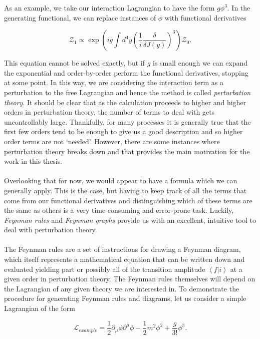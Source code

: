 As an example, we take our interaction Lagrangian to have the form $g \phi^3$. In the generating functional, we can replace instances of $\phi$ with functional derivatives

\begin{equation}
\mathcal{Z}_1 \propto \exp \left( i g \int d^4 y \left(\frac{1}{i} \frac{\delta}{\delta J(y)} \right)^3 \right) \mathcal{Z}_0.
\end{equation}

This equation cannot be solved exactly, but if $g$ is small enough we can expand the exponential and order-by-order perform the functional derivatives, stopping at some point. In this way, we are considering the interaction term as a perturbation to the free Lagrangian and hence the method is called \emph{perturbation theory}. It should be clear that as the calculation proceeds to higher and higher orders in perturbation theory, the number of terms to deal with gets uncontrollably large. Thankfully, for many processes it is generally true that the first few orders tend to be enough to give us a good description and so higher order terms are not `needed'. However, there are some instances where perturbation theory breaks down and that provides the main motivation for the work in this thesis. \\
\\
Overlooking that for now, we would appear to have a formula which we can generally apply. This is the case, but having to keep track of all the terms that come from our functional derivatives and distinguishing which of these terms are the same as others is a very time-consuming and error-prone task. Luckily, \emph{Feynman rules} and \emph{Feynman graphs} provide us with an excellent, intuitive tool to deal with perturbation theory. \\ 
\\
The Feynman rules are a set of instructions for drawing a Feynman diagram, which itself represents a mathematical equation that can be written down and evaluated yielding part or possibly all of the transition amplitude $\left<f | i \right>$ at a given order in perturbation theory. The Feynman rules themselves will depend on the Lagrangian of any given theory we are interested in. To demonstrate the procedure for generating Feynman rules and diagrams, let us consider a simple Lagrangian of the form

\begin{equation}
\mathscr{L}_{example} = \frac{1}{2}\partial_\mu \phi \partial^\mu \phi - \frac{1}{2}m^2 \phi^2 + \frac{g}{3!} \phi^3. 
\end{equation}

